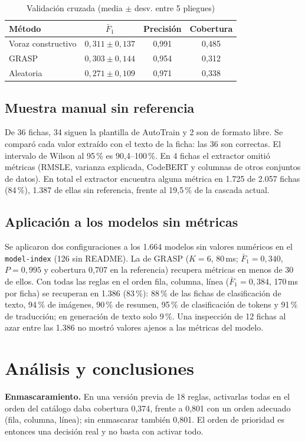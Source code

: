 \documentclass[conference]{IEEEtran}
\begin{document}
	\begin{table}[t]
		\centering
		\caption{Validaci\'on cruzada (media $\pm$ desv. entre 5 pliegues)}
		\label{tab:cv}
		\footnotesize
		\begin{tabular}{lccc}
			\toprule
			M\'etodo & $\bar F_1$ & Precisi\'on & Cobertura \\
			\midrule
			Voraz constructivo & $0{,}311\pm0{,}137$ & 0,991 & 0,485 \\
			GRASP & $0{,}303\pm0{,}144$ & 0,954 & 0,312 \\
			Aleatoria & $0{,}271\pm0{,}109$ & 0,971 & 0,338 \\
			\bottomrule
		\end{tabular}
	\end{table}
	
	\subsection{Muestra manual sin referencia}
	De 36 fichas, 34 siguen la plantilla de AutoTrain y 2 son de formato libre. Se compar\'o cada valor extra\'ido con el texto de la ficha: las 36 son correctas. El intervalo de Wilson \cite{wilson} al 95\,\% es 90,4--100\,\%. En 4 fichas el extractor omiti\'o m\'etricas (RMSLE, varianza explicada, CodeBERT y columnas de otros conjuntos de datos). En total el extractor encuentra alguna m\'etrica en 1.725 de 2.057 fichas (84\,\%), 1.387 de ellas sin referencia, frente al 19,5\,\% de la cascada actual.
	
	\subsection{Aplicaci\'on a los modelos sin m\'etricas}
	Se aplicaron dos configuraciones a los 1.664 modelos sin valores num\'ericos en el \texttt{model-index} (126 sin README). La de GRASP ($K=6$, 80\,ms; $\bar F_1=0{,}340$, $P=0{,}995$ y cobertura 0,707 en la referencia) recupera m\'etricas en menos de 30 de ellos. Con todas las reglas en el orden fila, columna, l\'inea ($\bar F_1=0{,}384$, 170\,ms por ficha) se recuperan en 1.386 (83\,\%): 88\,\% de las fichas de clasificaci\'on de texto, 94\,\% de im\'agenes, 90\,\% de resumen, 95\,\% de clasificaci\'on de tokens y 91\,\% de traducci\'on; en generaci\'on de texto solo 9\,\%. Una inspecci\'on de 12 fichas al azar entre las 1.386 no mostr\'o valores ajenos a las m\'etricas del modelo.
	
	\section{An\'alisis y conclusiones}
	\textbf{Enmascaramiento.} En una versi\'on previa de 18 reglas, activarlas todas en el orden del cat\'alogo daba cobertura 0,374, frente a 0,801 con un orden adecuado (fila, columna, l\'inea); sin enmascarar tambi\'en 0,801. El orden de prioridad es entonces una decisi\'on real y no basta con activar todo.
	
\end{document}
